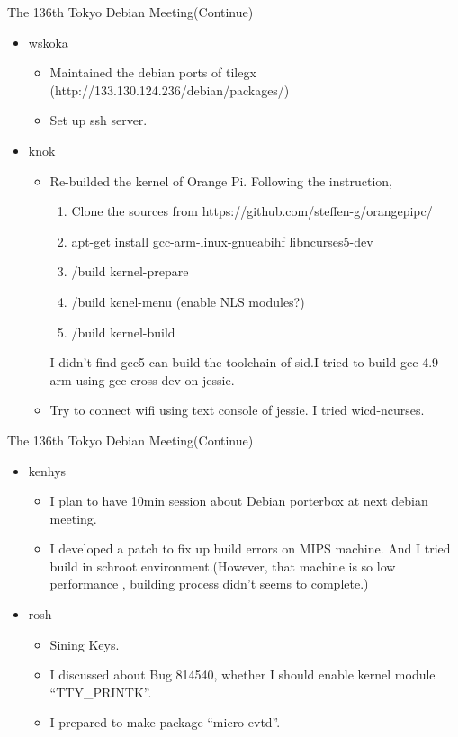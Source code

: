 \begin{frame}{The 136th Tokyo Debian Meeting(Continue)}

\begin{itemize}
\item wskoka
  \begin{itemize}
   \item Maintained the debian ports of tilegx (http://133.130.124.236/debian/packages/) 
   \item Set up ssh server.
  \end{itemize}
\item knok\\
  \begin{itemize}
  \item Re-builded the kernel of Orange Pi. Following the instruction,
    \begin{enumerate}
    \item Clone the sources from https://github.com/steffen-g/orangepipc/
    \item apt-get install gcc-arm-linux-gnueabihf libncurses5-dev
    \item /build kernel-prepare
    \item /build kenel-menu (enable NLS modules?)
    \item /build kernel-build
    \end{enumerate}
    I didn't find gcc5 can build the toolchain of sid.I tried to build gcc-4.9-arm using gcc-cross-dev on jessie.
  \item Try to connect wifi using text console of jessie. I tried wicd-ncurses.
  \end{itemize}
\end{itemize}
\end{frame}

\begin{frame}{The 136th Tokyo Debian Meeting(Continue)}

\begin{itemize}
\item kenhys
  \begin{itemize}
   \item I plan to have 10min session about Debian porterbox at next debian meeting.
   \item I developed a patch to fix up build errors on MIPS machine. And I tried build in schroot environment.(However, that machine is so low performance , building process didn't seems to complete.)
  \end{itemize}
\item rosh\\
  \begin{itemize}
  \item Sining Keys.
  \item I discussed about Bug 814540, whether I should enable kernel module ``TTY\_PRINTK''.
  \item I prepared to make package ``micro-evtd''.
  \end{itemize}
\end{itemize}
\end{frame}

